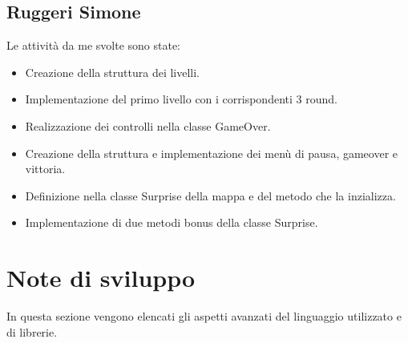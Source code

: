 \documentclass[a4paper,12pt]{report}
\begin{document}
\subsection{Ruggeri Simone}
Le attività da me svolte sono state:
\begin{itemize}
    \item Creazione della struttura dei livelli.
    \item Implementazione del primo livello con i corrispondenti 3 round.
    \item Realizzazione dei controlli nella classe GameOver.
    \item Creazione della struttura e implementazione dei menù di pausa, gameover e vittoria.
    \item Definizione nella classe Surprise della mappa e del metodo che la inzializza.
    \item Implementazione di due metodi bonus della classe Surprise.
\end{itemize}

\section{Note di sviluppo}
In questa sezione vengono elencati gli aspetti avanzati del linguaggio utilizzato e di librerie.
\end{document}
